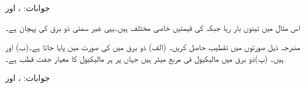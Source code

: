 جوابات: ،  اور 

اس مثال میں تینوں بار  رہا جبکہ  کی قیمتیں خاصی مختلف ہیں۔یہی غیر سمتی ذو برق کی پہچان ہے۔
 
مندرجہ ذیل صورتوں میں تقطیب حاصل کریں۔ (الف) ذو برق میں  کی صورت میں  پایا جاتا ہے۔(ب)  اور  ہیں۔ (پ)ذو برق میں   مالیکیول فی مربع میٹر ہیں جہاں  پر  ہر مالیکیول کا معیار جفت قطب
  ہے۔ 

جوابات: ،  اور 

